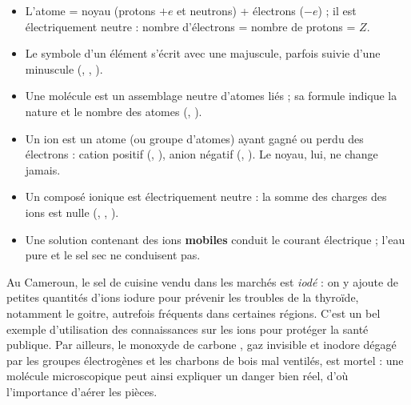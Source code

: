 \documentclass[11pt]{article}
\newcommand{\cle}[1]{{\popxbold\color{popdark}#1}}
\begin{document}
\begin{aretenir}
\begin{itemize}
\item L'\cle{atome} = noyau (protons $+e$ et neutrons) + électrons ($-e$) ; il est électriquement neutre : nombre d'électrons = nombre de protons = $Z$.
\item Le \cle{symbole} d'un élément s'écrit avec une majuscule, parfois suivie d'une minuscule (, , ).
\item Une \cle{molécule} est un assemblage neutre d'atomes liés ; sa formule indique la nature et le nombre des atomes (, ).
\item Un \cle{ion} est un atome (ou groupe d'atomes) ayant gagné ou perdu des électrons : \cle{cation} positif (, ), \cle{anion} négatif (, ). Le noyau, lui, ne change jamais.
\item Un \cle{composé ionique} est électriquement neutre : la somme des charges des ions est nulle (, , ).
\item Une solution contenant des ions \textbf{mobiles} conduit le courant électrique ; l'eau pure et le sel sec ne conduisent pas.
\end{itemize}
\end{aretenir}

\begin{savaistu}
Au Cameroun, le sel de cuisine vendu dans les marchés est \emph{iodé} : on y ajoute de petites quantités d'ions iodure  pour prévenir les troubles de la thyroïde, notamment le goitre, autrefois fréquents dans certaines régions. C'est un bel exemple d'utilisation des connaissances sur les ions pour protéger la santé publique. Par ailleurs, le monoxyde de carbone , gaz invisible et inodore dégagé par les groupes électrogènes et les charbons de bois mal ventilés, est mortel : une molécule microscopique peut ainsi expliquer un danger bien réel, d'où l'importance d'aérer les pièces.
\end{savaistu}
\end{document}
